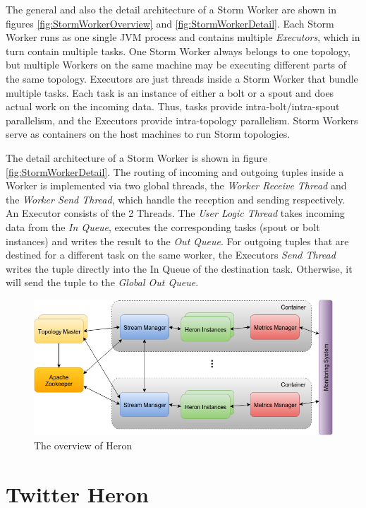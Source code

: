 \documentclass[conference]{IEEEtran}
\begin{document}
The general and also the detail architecture of a Storm Worker are shown in figures \ref{fig:StormWorkerOverview} and \ref{fig:StormWorkerDetail}.
Each Storm Worker runs as one single JVM process and contains multiple \emph{Executors}, which in turn contain multiple tasks.
One Storm Worker always belongs to one topology, but multiple Workers on the same machine may be executing different parts of the same topology.
Executors are just threads inside a Storm Worker that bundle multiple tasks.
Each task is an instance of either a bolt or a spout and does actual work on the incoming data.
Thus, tasks provide intra-bolt/intra-spout parallelism, and the Executors provide intra-topology parallelism.
Storm Workers serve as containers on the host machines to run Storm topologies.

The detail architecture of a Storm Worker is shown in figure \ref{fig:StormWorkerDetail}.
The routing of incoming and outgoing tuples inside a Worker is implemented via two global threads, the \emph{Worker Receive Thread} and the \emph{Worker Send Thread}, which handle the reception and sending respectively.
An Executor consists of the 2 Threads.
The \emph{User Logic Thread} takes incoming data from the \emph{In Queue}, executes the corresponding tasks (spout or bolt instances) and writes the result to the \emph{Out Queue}.
For outgoing tuples that are destined for a different task on the same worker, the Executors \emph{Send Thread} writes the tuple directly into the In Queue of the destination task.
Otherwise, it will send the tuple to the \emph{Global Out Queue}.

\begin{figure}
	\centering
    \includegraphics[scale=0.35]{figures/HeronOverview}
    \caption{The overview of Heron}
    \label{fig:HeronOverview}
\end{figure}

\section{Twitter Heron}
\label{sec:TwitterHeron}
\end{document}
